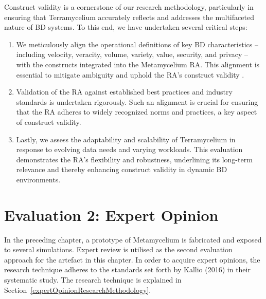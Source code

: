 \documentclass[journal]{IEEEtran}
\begin{document}
Construct validity is a cornerstone of our research methodology, particularly in ensuring that Terramycelium accurately reflects and addresses the multifaceted nature of BD systems. To this end, we have undertaken several critical steps:

\begin{enumerate}
    \item We meticulously align the operational definitions of key BD characteristics -- including velocity, veracity, volume, variety, value, security, and privacy -- with the constructs integrated into the Metamycelium RA. This alignment is essential to mitigate ambiguity and uphold the RA's construct validity \cite{rad2017big}.
    
    
    \item Validation of the RA against established best practices and industry standards is undertaken rigorously. Such an alignment is crucial for ensuring that the RA adheres to widely recognized norms and practices, a key aspect of construct validity.
    
    \item Lastly, we assess the adaptability and scalability of Terramycelium in response to evolving data needs and varying workloads. This evaluation demonstrates the RA's flexibility and robustness, underlining its long-term relevance and thereby enhancing construct validity in dynamic BD environments.
\end{enumerate}


\section{Evaluation 2: Expert Opinion}

In the preceding chapter, a prototype of Metamycelium is fabricated and exposed to several simulations. Expert review is utilised as the second evaluation approach for the artefact in this chapter. In order to acquire expert opinions, the research technique adheres to the standards set forth by Kallio (2016) in their systematic study. The research technique is explained in Section~\ref{expertOpinionResearchMethodology}.
\end{document}
